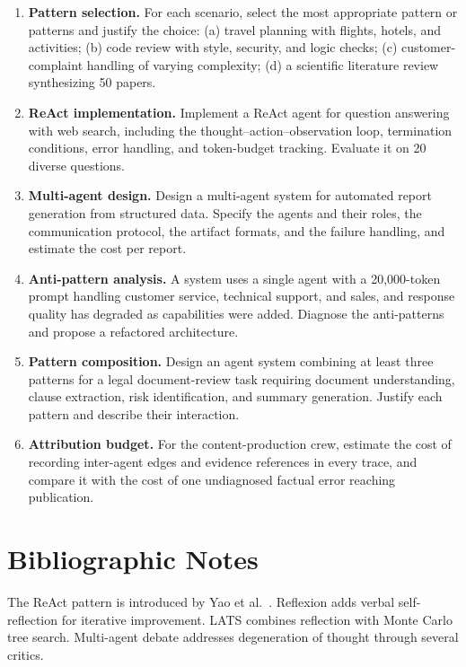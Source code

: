 \documentclass[11pt]{book}
\begin{document}
\begin{enumerate}
\item \textbf{Pattern selection.} For each scenario, select the most appropriate pattern or patterns and justify the choice: (a) travel planning with flights, hotels, and activities; (b) code review with style, security, and logic checks; (c) customer-complaint handling of varying complexity; (d) a scientific literature review synthesizing 50 papers.

\item \textbf{ReAct implementation.} Implement a ReAct agent for question answering with web search, including the thought--action--observation loop, termination conditions, error handling, and token-budget tracking. Evaluate it on 20 diverse questions.

\item \textbf{Multi-agent design.} Design a multi-agent system for automated report generation from structured data. Specify the agents and their roles, the communication protocol, the artifact formats, and the failure handling, and estimate the cost per report.

\item \textbf{Anti-pattern analysis.} A system uses a single agent with a 20{,}000-token prompt handling customer service, technical support, and sales, and response quality has degraded as capabilities were added. Diagnose the anti-patterns and propose a refactored architecture.

\item \textbf{Pattern composition.} Design an agent system combining at least three patterns for a legal document-review task requiring document understanding, clause extraction, risk identification, and summary generation. Justify each pattern and describe their interaction.

\item \textbf{Attribution budget.} For the content-production crew, estimate the cost of recording inter-agent edges and evidence references in every trace, and compare it with the cost of one undiagnosed factual error reaching publication.
\end{enumerate}

\section*{Bibliographic Notes}

The ReAct pattern is introduced by Yao et al.\ \cite{react2022}. Reflexion \cite{reflexion2023} adds verbal self-reflection for iterative improvement. LATS \cite{lats2023} combines reflection with Monte Carlo tree search. Multi-agent debate \cite{mar2025} addresses degeneration of thought through several critics.
\end{document}
